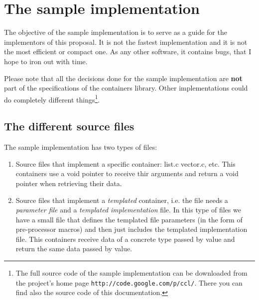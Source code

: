 \documentclass[12pt,a4paper]{memoir} %
\begin{document}
{{\chapter{The sample implementation}
The objective of the sample implementation is to serve as a guide for the implementors of this proposal. It is not the fastest implementation and it is not the most efficient or compact one. As any other software, it contains bugs, that I hope to iron out with time.

Please note that all the decisions done for the sample implementation are \textbf{not} part of the specifications of the containers library. Other
implementations could do completely different things\footnote{The full source code of the sample implementation can be downloaded from
the project's home page  \Verb,http://code.google.com/p/ccl/,. There you can find also the source code of this documentation. }.
\section{The different source files}

The sample implementation has two types of files:
\begin{enumerate}
\item Source files that implement a specific container: list.c vector.c, etc. This containers use a void pointer to receive thir arguments and return
a void pointer when retrieving their data.
\item Source files that implement a \textsl{templated} container, i.e. the file needs a \textsl{parameter file} and a \textsl{templated implementation} 
file. In this type of files we have a small file that defines the templated file parameters (in the form of pre-processor macros) and then just 
includes the templated implementation file. This containers receive data of a concrete type passed by value and return the same data passed by value.
\end{enumerate}

}}
\end{document}
